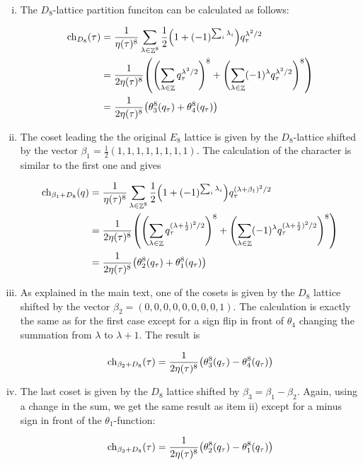 \documentclass{article}
\DeclareMathOperator{\bbZ}{\mathbb{Z}}
\begin{document}
 \begin{enumerate}[i)]
     \item The $D_8$-lattice partition funciton can be calculated as follows:
     
     \begin{align}
         \mathrm{ch}_{D_8}(\tau) &= \frac{1}{\eta(\tau)^8}\sum_{\lambda \in \bbZ^8}\frac{1}{2}\qty(1 + (-1)^{\sum_i \lambda_i})q_\tau^{\lambda^2/2}\nonumber\\
         &= \frac{1}{2\eta(\tau)^8}\qty(\qty(\sum_{\lambda \in \bbZ} q_\tau^{\lambda^2/2})^8 + \qty(\sum_{\lambda \in \bbZ}(-1)^\lambda q_\tau^{\lambda^2/2} )^8)\\
         &= \frac{1}{2\eta(\tau)^8}\qty(\theta_3^8(q_\tau) + \theta_4^8(q_\tau))\nonumber
         \label{eq:ch_D8}
     \end{align}
     
     \item The coset leading the the original $E_8$ lattice is given by the $D_8$-lattice shifted by the vector $\beta_1 = \frac{1}{2}(1,1,1,1,1,1,1,1)$. The calculation of the character is similar to the first one and gives
     
    \begin{align}
         \mathrm{ch}_{\beta_1 + D_8}(q) &= \frac{1}{\eta(\tau)^8}\sum_{\lambda \in \bbZ^8}\frac{1}{2}\qty(1 + (-1)^{\sum_i \lambda_i})q_\tau^{(\lambda+\beta_1)^2/2}\nonumber\\
         &= \frac{1}{2\eta(\tau)^8}\qty(\qty(\sum_{\lambda \in \bbZ} q_\tau^{(\lambda+ \frac{1}{2})^2/2})^8 + \qty(\sum_{\lambda \in \bbZ}(-1)^\lambda q_\tau^{(\lambda+\frac{1}{2})^2/2} )^8)\\
         &= \frac{1}{2\eta(\tau)^8}\qty(\theta_2^8(q_\tau) + \theta_1^8(q_\tau))\nonumber
     \end{align}
     
     \item As explained in the main text, one of the cosets is given by the $D_8$ lattice shifted by the vector $\beta_2 = (0,0,0,0,0,0,0,0,1)$. The calculation is exactly the same as for the first case except for a sign flip in front of $\theta_4$ changing the summation from $\lambda$ to $\lambda +1$. The result is 
     
     \begin{equation}
        \mathrm{ch}_{\beta_2 + D_8}(\tau)= \frac{1}{2\eta(\tau)^8}\qty(\theta_3^8(q_\tau) - \theta_4^8(q_\tau))
     \end{equation}
     
     \item The last coset is given by the $D_8$ lattice shifted by $\beta_3 = \beta_1 - \beta_2$. Again, using a change in the sum, we get the same result as item ii) except for a minus sign in front of the $\theta_1$-function:
     
     \begin{equation}
        \mathrm{ch}_{\beta_3 + D_8}(\tau)= \frac{1}{2\eta(\tau)^8}\qty(\theta_2^8(q_\tau) - \theta_1^8(q_\tau))
     \end{equation}
     
 \end{enumerate}
 
\end{document}
